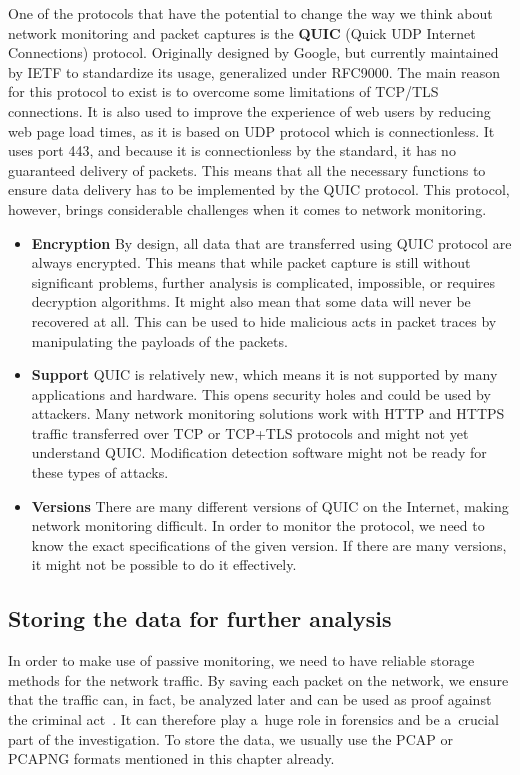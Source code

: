 \documentclass[
  printed,     %
  color,       %
  oneside,     %
  nosansbold,  %
  nocolorbold, %
  nolof,         %
  nolot,         %
]{fithesis4}
\begin{document}
One of the protocols that have the potential to change the way we think about network monitoring and packet captures is the \textbf{QUIC} (Quick UDP Internet Connections) protocol. Originally designed by Google, but currently maintained by IETF to standardize its usage, generalized under RFC9000. The main reason for this protocol to exist is to overcome some limitations of TCP/TLS connections. It is also used to improve the experience of web users by reducing web page load times, as it is based on UDP protocol which is connectionless. It uses port 443, and because it is connectionless by the standard, it has no guaranteed delivery of packets. This means that all the necessary functions to ensure data delivery has to be implemented by the QUIC protocol. This protocol, however, brings considerable challenges when it comes to network monitoring. 

\begin{itemize}
    \item \textbf{Encryption} By design, all data that are transferred using QUIC protocol are always encrypted. This means that while packet capture is still without significant problems, further analysis is complicated, impossible, or requires decryption algorithms. It might also mean that some data will never be recovered at all. This can be used to hide malicious acts in packet traces by manipulating the payloads of the packets.
    \item \textbf{Support} QUIC is relatively new, which means it is not supported by many applications and hardware. This opens security holes and could be used by attackers. Many network monitoring solutions work with HTTP and HTTPS traffic transferred over TCP or TCP+TLS protocols and might not yet understand QUIC. Modification detection software might not be ready for these types of attacks.
    \item \textbf{Versions} There are many different versions of QUIC on the Internet, making network monitoring difficult. In order to monitor the protocol, we need to know the exact specifications of the given version. If there are many versions, it might not be possible to do it effectively.
\end{itemize}

\subsection{Storing the data for further analysis}

In order to make use of passive monitoring, we need to have reliable storage methods for the network traffic. By saving each packet on the network, we ensure that the traffic can, in fact, be analyzed later and can be used as proof against the criminal act~\cite{ABBASI202119}. It can therefore play a~huge role in forensics and be a~crucial part of the investigation. To store the data, we usually use the PCAP or PCAPNG formats mentioned in this chapter already. 
\end{document}
